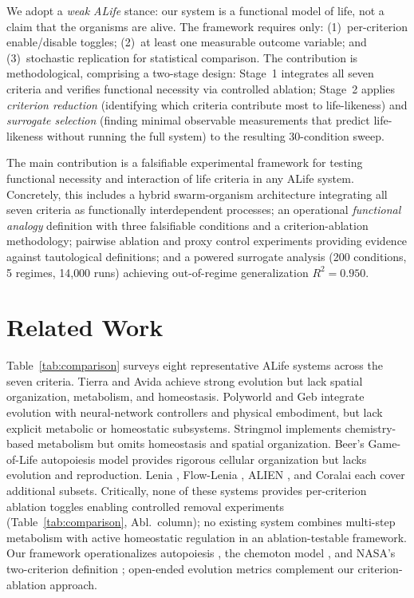 \documentclass[letterpaper]{article}
\begin{document}
We adopt a \emph{weak ALife} stance: our system is a functional model of life,
not a claim that the organisms are alive.
The framework requires only: (1)~per-criterion enable/disable toggles;
(2)~at least one measurable outcome variable; and (3)~stochastic replication
for statistical comparison.
The contribution is methodological, comprising a two-stage design: Stage~1 integrates
all seven criteria and verifies functional necessity via controlled ablation;
Stage~2 applies \emph{criterion reduction} (identifying which criteria
contribute most to life-likeness) and \emph{surrogate selection} (finding
minimal observable measurements that predict life-likeness without running
the full system) to the resulting 30-condition sweep.

The main contribution is a falsifiable experimental framework for testing
functional necessity and interaction of life criteria in any ALife system.
Concretely, this includes a hybrid swarm-organism architecture integrating
all seven criteria as functionally interdependent processes;
an operational \emph{functional analogy} definition with three falsifiable
conditions and a criterion-ablation methodology; pairwise ablation and
proxy control experiments providing evidence against tautological definitions;
and a powered surrogate analysis (200 conditions, 5 regimes, 14{,}000 runs)
achieving out-of-regime generalization $R^2=0.950$.

\section{Related Work}

Table~\ref{tab:comparison} surveys eight representative ALife systems across
the seven criteria.
Tierra \citep{ray_1991_approach} and Avida \citep{ofria_2004_avida} achieve
strong evolution but lack spatial organization, metabolism, and homeostasis.
Polyworld \citep{yaeger_1994_computational} and Geb \citep{channon_2001_passing}
integrate evolution with neural-network controllers and physical embodiment,
but lack explicit metabolic or homeostatic subsystems.
Stringmol \citep{hickinbotham_2011_stringmol} implements chemistry-based
metabolism but omits homeostasis and spatial organization.
Beer's Game-of-Life autopoiesis model \citep{beer_2004_autopoiesis} provides
rigorous cellular organization but lacks evolution and reproduction.
Lenia \citep{chan_2019_lenia}, Flow-Lenia \citep{plantec_2023_flow}, ALIEN
\citep{heinemann_2008_alien}, and Coralai \citep{barbieux_2024_coralai}
each cover additional subsets.
Critically, none of these systems provides per-criterion ablation toggles
enabling controlled removal experiments (Table~\ref{tab:comparison}, Abl.\
column); no existing system combines multi-step metabolism with active
homeostatic regulation in an ablation-testable framework.
Our framework operationalizes autopoiesis \citep{maturana_1980_autopoiesis,
mcmullin_2004_thirty}, the chemoton model \citep{ganti_2003_principles},
and NASA's two-criterion definition \citep{joyce_1994_foreword,
ruizmirazo_2004_universal}; open-ended evolution metrics
\citep{bedau_2000_open, taylor_2016_openended} complement
our criterion-ablation approach.
\end{document}
